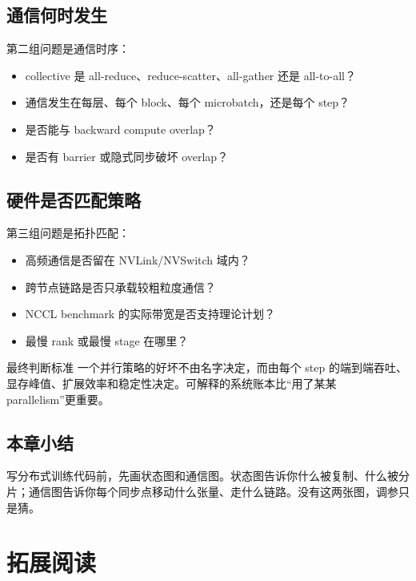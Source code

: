 \documentclass[a4paper]{article}
\begin{document}
\subsection{通信何时发生}

第二组问题是通信时序：

\begin{itemize}
    \item collective 是 all-reduce、reduce-scatter、all-gather 还是 all-to-all？
    \item 通信发生在每层、每个 block、每个 microbatch，还是每个 step？
    \item 是否能与 backward compute overlap？
    \item 是否有 barrier 或隐式同步破坏 overlap？
\end{itemize}

\subsection{硬件是否匹配策略}

第三组问题是拓扑匹配：

\begin{itemize}
    \item 高频通信是否留在 NVLink/NVSwitch 域内？
    \item 跨节点链路是否只承载较粗粒度通信？
    \item NCCL benchmark 的实际带宽是否支持理论计划？
    \item 最慢 rank 或最慢 stage 在哪里？
\end{itemize}

\begin{importantbox}{最终判断标准}
一个并行策略的好坏不由名字决定，而由每个 step 的端到端吞吐、显存峰值、扩展效率和稳定性决定。可解释的系统账本比“用了某某 parallelism”更重要。
\end{importantbox}

\subsection{本章小结}

写分布式训练代码前，先画状态图和通信图。状态图告诉你什么被复制、什么被分片；通信图告诉你每个同步点移动什么张量、走什么链路。没有这两张图，调参只是猜。

\section{拓展阅读}
\end{document}
